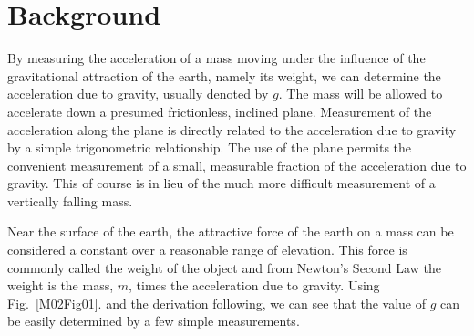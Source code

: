 

\label{lab:M2}

\section{Background}



By measuring the acceleration of a mass moving under the influence of the gravitational attraction of the earth, namely its weight, we can determine the acceleration due to gravity, usually denoted by $g$.  The mass will be allowed to accelerate down a presumed frictionless, inclined plane.  Measurement of the acceleration along the plane is directly related to the acceleration due to gravity by a simple trigonometric relationship.  The use of the plane permits the convenient measurement of a small, measurable fraction of the acceleration due to gravity.  This of course is in lieu of the much more difficult measurement of a vertically falling mass.














Near the surface of the earth, the attractive force of the earth on a mass can be considered a constant over a reasonable range of elevation. This force is commonly called the weight of the object and from Newton's Second Law the weight is the mass, $m$, times the acceleration due to gravity. Using Fig.~\ref{M02Fig01}. and the derivation following, we can see that the value of $g$ can be easily determined by a few simple measurements.

